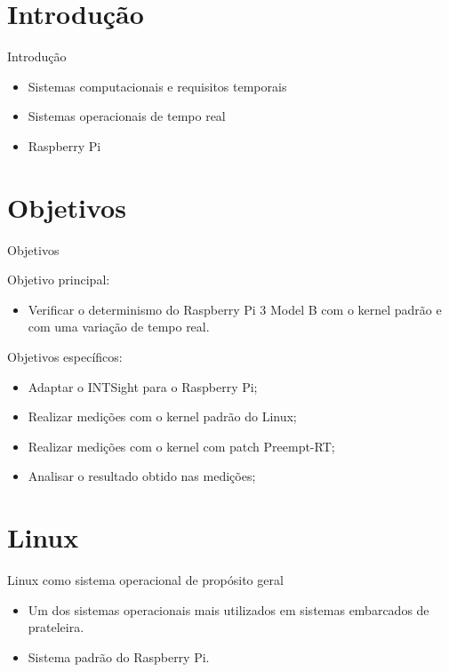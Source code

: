 \documentclass[12pt,brazil]{beamer}
\begin{document}
\section{Introdução}

\begin{frame}{Introdução}
\begin{itemize}
    \item Sistemas computacionais e requisitos temporais
    \item Sistemas operacionais de tempo real
    \item Raspberry Pi
\end{itemize}
\end{frame}

\section{Objetivos}

\begin{frame}{Objetivos}

Objetivo principal:
\begin{itemize}
    \item Verificar o determinismo do Raspberry Pi 3 Model B com o kernel padrão e com uma variação de tempo real.
\end{itemize}

Objetivos específicos:
\begin{itemize}
    \item Adaptar o INTSight para o Raspberry Pi;
    \item Realizar medições com o kernel padrão do Linux;
    \item Realizar medições com o kernel com patch Preempt-RT;
    \item Analisar o resultado obtido nas medições;
\end{itemize}
\end{frame}

\section{Linux}

\begin{frame}{Linux como sistema operacional de propósito geral}
\begin{itemize}
    \item Um dos sistemas operacionais mais utilizados em sistemas embarcados de prateleira.
    \item Sistema padrão do Raspberry Pi.
\end{itemize}
\end{frame}
\end{document}
